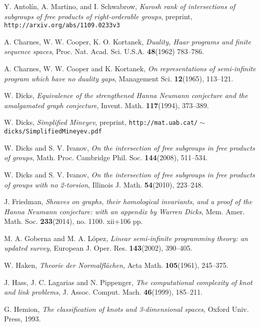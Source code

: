 \documentclass[10pt, reqno]{amsart}
\numberwithin{equation}{section}
\begin{document}
\begin{thebibliography}{[10]}

 Y. Antol\'in, A. Martino, and I. Schwabrow,
{\em Kurosh rank of intersections of subgroups of free products of right-orderable groups},
preprint, \texttt{http://arxiv.org/abs/1109.0233v3}

  A. Charnes, W. W. Cooper, K. O. Kortanek, {\em Duality, Haar
programs and finite sequence spaces},  Proc. Nat. Acad. Sci. U.S.A.  {\bf 48}(1962) 783--786.

 A. Charnes, W. W. Cooper and K. Kortanek, {\em On representations of semi-infinite program
which have no duality gaps}, Management Sci. {\bf 12}(1965), 113--121.

  W. Dicks,  {\em Equivalence of the strengthened
Hanna Neumann conjecture and the amalgamated graph conjecture},
Invent. Math. {\bf  117}(1994), 373--389.

  W. Dicks, {\em Simplified Mineyev}, preprint,
 \texttt{http://mat.uab.cat/$\! \sim$dicks/SimplifiedMineyev.pdf}

  W. Dicks and S. V. Ivanov, {\em On the intersection
of free subgroups in free products of groups},   Math. Proc. Cambridge
Phil. Soc. {\bf 144}(2008), 511--534.

   W. Dicks and S. V. Ivanov, {\em On the intersection
of free subgroups in free products of groups with no
2-torsion},   Illinois J. Math. {\bf 54}(2010), 223--248.

J. Friedman, {\em Sheaves on graphs, their homological invariants, and a proof of
the Hanna Neumann conjecture: with an appendix by Warren Dicks},
Mem. Amer. Math. Soc. {\bf  233}(2014), no. 1100. xii+106 pp.

   M. A. Goberna and M. A. L\'opez,
{\em Linear semi-infinite programming theory: an updated survey},
European J. Oper. Res.  {\bf 143}(2002), 390--405.

 W. Haken, {\em Theorie der Normalfl\"achen},
Acta Math. {\bf 105}(1961), 245--375.

   J. Hass, J. C. Lagarias  and N. Pippenger,
 {\em The computational complexity of knot and link problems},
 J. Assoc. Comput. Mach. {\bf 46}(1999), 185--211.

  G. Hemion,
 {\em  The classification of knots and 3-dimensional spaces},
 Oxford Univ. Press, 1993.


\end{thebibliography}
\end{document}
